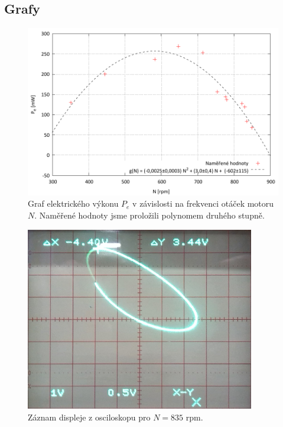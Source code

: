 \documentclass[english]{article}
\begin{document}
\subsection{Grafy}

	\begin{figure}[h!]
	\begin{center}
	    \includegraphics[width=\linewidth]{../gnuplot/12_stir.pdf}
	    	\caption{Graf elektrického výkonu $P_e$ v závislosti na frekvenci otáček motoru $N$. Naměřené hodnoty jsme proložili polynomem druhého stupně.}
			\label{fig:g_graf}
	\end{center}
	\end{figure}

\clearpage
    \begin{figure}[h!]
	\begin{center}
	    \includegraphics[width=10cm]{att/2.jpg}
	    	\caption{Záznam displeje z osciloskopu pro $N=835$ rpm.}
			\label{fig:o2}
	\end{center}
	\end{figure}
	
\end{document}
